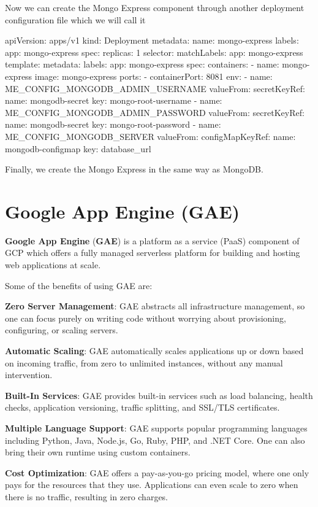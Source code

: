 Now we can create the Mongo Express component through another deployment configuration file which we will call it
\begin{block}
apiVersion: apps/v1
kind: Deployment
metadata:
  name: mongo-express
  labels:
    app: mongo-express
spec:
  replicas: 1
  selector:
    matchLabels:
      app: mongo-express
  template:
    metadata:
      labels:
        app: mongo-express
    spec:
      containers:
      - name: mongo-express
        image: mongo-express
        ports:
        - containerPort: 8081
        env:
        - name: ME_CONFIG_MONGODB_ADMIN_USERNAME
          valueFrom:
            secretKeyRef:
              name: mongodb-secret
              key: mongo-root-username
        - name: ME_CONFIG_MONGODB_ADMIN_PASSWORD
          valueFrom:
            secretKeyRef:
              name: mongodb-secret
              key: mongo-root-password
        - name: ME_CONFIG_MONGODB_SERVER
          valueFrom:
            configMapKeyRef:
              name: mongodb-configmap
              key: database_url
\end{block}

Finally, we create the Mongo Express in the same way as MongoDB\@.

\section{Google App Engine (GAE)}

\textbf{Google App Engine} (\textbf{GAE}) is a platform as a service (PaaS) component of GCP which offers a fully
managed serverless platform for building and hosting web applications at scale.
\ed

Some of the benefits of using GAE are:
\bit
\item \textbf{Zero Server Management}: GAE abstracts all infrastructure management, so one can focus purely on
writing code without worrying about provisioning, configuring, or scaling servers.
\item \textbf{Automatic Scaling}: GAE automatically scales applications up or down based on incoming traffic,
from zero to unlimited instances, without any manual intervention.
\item \textbf{Built-In Services}: GAE provides built-in services such as load balancing, health checks,
application versioning, traffic splitting, and SSL/TLS certificates.
\item \textbf{Multiple Language Support}: GAE supports popular programming languages including Python, Java, Node.js,
Go, Ruby, PHP, and .NET Core. One can also bring their own runtime using custom containers.
\item \textbf{Cost Optimization}: GAE offers a pay-as-you-go pricing model, where one only pays for the resources
that they use. Applications can even scale to zero when there is no traffic, resulting in zero charges.
\eit

